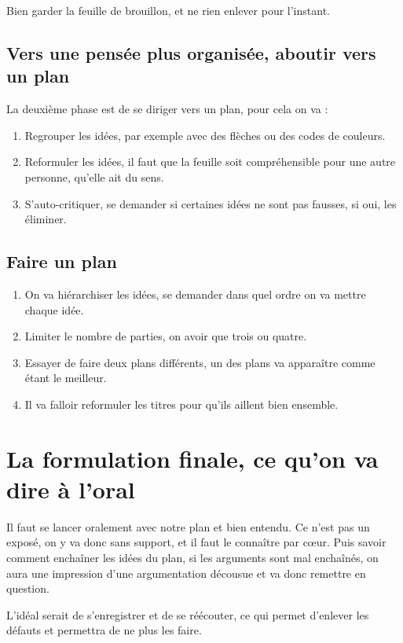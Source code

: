 \documentclass[final, a4paper, 11pt]{article}
\begin{document}
Bien garder la feuille de brouillon, et ne rien enlever pour l'instant.

\subsection{Vers une pensée plus organisée, aboutir vers un plan}
La deuxième phase est de se diriger vers un plan, pour cela on va :

\begin{enumerate}
	\item Regrouper les idées, par exemple avec des flèches ou des codes de couleurs.
	\item Reformuler les idées, il faut que la feuille soit compréhensible pour une autre personne, qu'elle ait du sens.
	\item S'auto-critiquer, se demander si certaines idées ne sont pas fausses, si oui, les éliminer.
\end{enumerate}

\subsection{Faire un plan}
\begin{enumerate}
	\item On va hiérarchiser les idées, se demander dans quel ordre on va mettre chaque idée.
	\item Limiter le nombre de parties, on avoir que trois ou quatre.
	\item Essayer de faire deux plans différents, un des plans va apparaître comme étant le meilleur.
	\item Il va falloir reformuler les titres pour qu'ils aillent bien ensemble.
\end{enumerate}

\section{La formulation finale, ce qu'on va dire à l'oral}
Il faut se lancer oralement avec notre plan et bien entendu. Ce n'est pas un exposé, on y va donc sans support, et il faut le connaître par cœur. Puis savoir comment enchaîner les idées du plan, si les arguments sont mal enchaînés, on aura une impression d'une argumentation décousue et va donc remettre en question.

L'idéal serait de s'enregistrer et de se réécouter, ce qui permet d'enlever les défauts et permettra de ne plus les faire.
\end{document}
